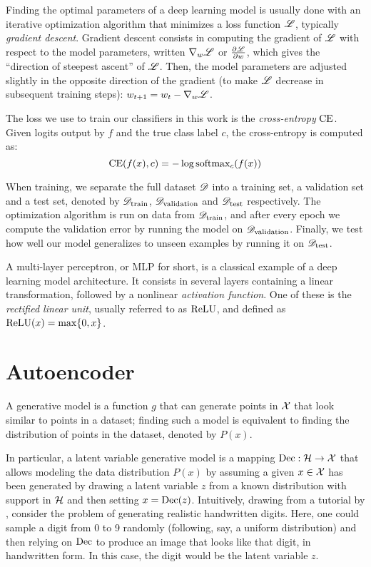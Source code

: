 \documentclass[../main.tex]{subfiles}
\begin{document}
Finding the optimal parameters of a deep learning model is usually done with an iterative optimization algorithm that minimizes a loss function $\mathscr{L}$, typically \emph{gradient descent}.
Gradient descent consists in computing the gradient of $\mathscr{L}$ with respect to the model parameters, written $\nabla_w \mathscr{L}$ or $\frac{\partial \mathscr{L}}{\partial w}$, which gives the ``direction of steepest ascent'' of $\mathscr{L}$.
Then, the model parameters are adjusted slightly in the opposite direction of the gradient (to make $\mathscr{L}$ decrease in subsequent training steps): $w_{t+1} = w_t - \nabla_w \mathscr{L}$.

The loss we use to train our classifiers in this work is the \emph{cross-entropy} $\text{CE}$.
Given logits output by $f$ and the true class label $c$, the cross-entropy is computed as:
\begin{equation}
\text{CE}(f(x), c) = - \log \mathrm{softmax}_c(f(x))
\end{equation}

When training, we separate the full dataset $\mathscr{D}$ into a training set, a validation set and a test set, denoted by $\mathscr{D}_\text{train}$, $\mathscr{D}_\text{validation}$ and $\mathscr{D}_\text{test}$ respectively.
The optimization algorithm is run on data from $\mathscr{D}_\text{train}$, and after every epoch we compute the validation error by running the model on $\mathscr{D}_\text{validation}$. Finally, we test how well our model generalizes to unseen examples by running it on $\mathscr{D}_\text{test}$.

A multi-layer perceptron, or MLP for short, is a classical example of a deep learning model architecture.
It consists in several layers containing a linear transformation, followed by a nonlinear \emph{activation function}.
One of these is the \emph{rectified linear unit}, usually referred to as $\text{ReLU}$, and defined as $\text{ReLU}(x) = \max\{0, x\}$.

\section{Autoencoder}

A generative model is a function $g$ that can generate points in $\mathcal{X}$ that look similar to points in a dataset; finding such a model is equivalent to finding the distribution of points in the dataset, denoted by $P(x)$.

In particular, a latent variable generative model is a mapping $\operatorname{Dec}: \mathcal{H} \to \mathcal{X}$ that allows modeling the data distribution $P(x)$ by assuming a given $x \in \mathcal{X}$ has been generated by drawing a latent variable $z$ from a known distribution with support in $\mathcal{H}$ and then setting $x = \operatorname{Dec}(z)$.
Intuitively, drawing from a tutorial by \citeauthor{doerschTutorial2021} \cite{doerschTutorial2021}, consider the problem of generating realistic handwritten digits.
Here, one could sample a digit from 0 to 9 randomly (following, say, a uniform distribution) and then relying on $\operatorname{Dec}$ to produce an image that looks like that digit, in handwritten form. In this case, the digit would be the latent variable $z$.
\end{document}
